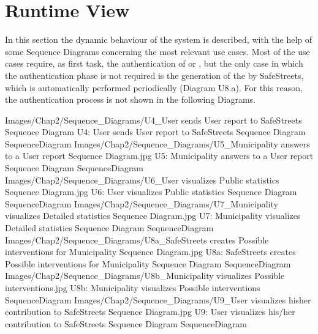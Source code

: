 \documentclass[../../DD.tex]{subfiles}
\begin{document}
\section{Runtime View\label{sect:2.4}}

In this section the dynamic behaviour of the system is described, with the help of some Sequence Diagrams concerning the most relevant use cases.
Most of the use cases require, as first task, the authentication of  or , but the only case in which the authentication phase is not required is the generation of the  by SafeStreets, which is automatically performed periodically (Diagram U8.a). For this reason, the authentication process is not shown in the following Diagrams.

\image {10cm} {Images/Chap2/Sequence_Diagrams/U4_User sends User report to SafeStreets Sequence Diagram} {U4: User sends User report to SafeStreets Sequence Diagram} {SequenceDiagram}
\image {8cm} {Images/Chap2/Sequence_Diagrams/U5_Municipality answers to a User report Sequence Diagram.jpg} {U5: Municipality answers to a User report Sequence Diagram} {SequenceDiagram}
\image {8cm} {Images/Chap2/Sequence_Diagrams/U6_User visualizes Public statistics Sequence Diagram.jpg} {U6: User visualizes Public statistics Sequence Diagram} {SequenceDiagram}
\image {12cm} {Images/Chap2/Sequence_Diagrams/U7_Municipality visualizes Detailed statistics Sequence Diagram.jpg} {U7: Municipality visualizes Detailed statistics Sequence Diagram} {SequenceDiagram}
\image {10cm} {Images/Chap2/Sequence_Diagrams/U8a_SafeStreets creates Possible interventions for Municipality Sequence Diagram.jpg} {U8a: SafeStreets creates Possible interventions for Municipality Sequence Diagram} {SequenceDiagram}
\image {4cm} {Images/Chap2/Sequence_Diagrams/U8b_Municipality visualizes Possible interventions.jpg} {U8b: Municipality visualizes Possible interventions} {SequenceDiagram}
\image {8cm} {Images/Chap2/Sequence_Diagrams/U9_User visualizes hisher contribution to SafeStreets Sequence Diagram.jpg} {U9: User visualizes his/her contribution to SafeStreets Sequence Diagram} {SequenceDiagram}

\newpage
\end{document}
